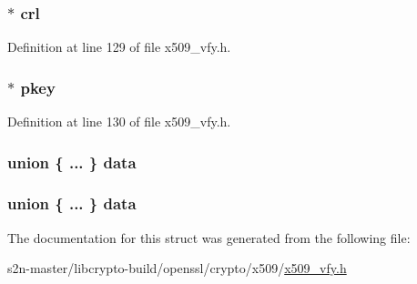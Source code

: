 \subsubsection[{\texorpdfstring{crl}{crl}}]{$\ast$ crl}\hypertarget{structx509__object__st_a34fe84e0f1ecba5f97d6b22eded9c633}{}\label{structx509__object__st_a34fe84e0f1ecba5f97d6b22eded9c633}


Definition at line 129 of file x509\+\_\+vfy.\+h.

\subsubsection[{\texorpdfstring{pkey}{pkey}}]{$\ast$ pkey}\hypertarget{structx509__object__st_a76a3c5d8ec8f468075eb3e366a35a83c}{}\label{structx509__object__st_a76a3c5d8ec8f468075eb3e366a35a83c}


Definition at line 130 of file x509\+\_\+vfy.\+h.

\subsubsection[{\texorpdfstring{data}{data}}]{\setlength{\rightskip}{0pt plus 5cm}union \{ ... \}   data}\hypertarget{structx509__object__st_aaa8e5ba0923512e32dac97b86bc7fef8}{}\label{structx509__object__st_aaa8e5ba0923512e32dac97b86bc7fef8}
\subsubsection[{\texorpdfstring{data}{data}}]{\setlength{\rightskip}{0pt plus 5cm}union \{ ... \}   data}\hypertarget{structx509__object__st_a3b547cc9e1ecdf9f53dbe587c5ee33c0}{}\label{structx509__object__st_a3b547cc9e1ecdf9f53dbe587c5ee33c0}


The documentation for this struct was generated from the following file\+:\begin{DoxyCompactItemize}
\item 
s2n-\/master/libcrypto-\/build/openssl/crypto/x509/\hyperlink{crypto_2x509_2x509__vfy_8h}{x509\+\_\+vfy.\+h}\end{DoxyCompactItemize}
